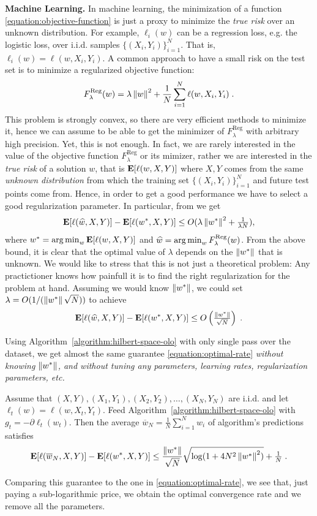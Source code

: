 \textbf{Machine Learning.} In machine learning, the minimization of a function
\eqref{equation:objective-function} is just a proxy to minimize the \emph{true
risk} over an unknown distribution. For example, $\ell_i(w)$ can be a
regression loss, e.g. the logistic loss, over i.i.d. samples $\{(X_i,
Y_i)\}_{i=1}^N$. That is, $\ell_i(w)=\ell(w,X_i,Y_i)$. A common approach to
have a small risk on the test set is to minimize a regularized objective
function:
%
\begin{equation}
\label{eq:reg_logloss}
F_\lambda^{\text{Reg}}(w) = \lambda \left\|{w}\right\|^2 + \frac{1}{N} \sum_{i=1}^N \ell(w, X_i, Y_i) \; .
\end{equation}
%
This problem is strongly convex, so there are very efficient methods to
minimize it, hence we can assume to be able to get the minimizer of
$F_\lambda^{\text{Reg}}$ with arbitrary high precision. Yet, this is not
enough. In fact, we are rarely interested in the value of the objective
function $F_\lambda^{\text{Reg}}$ or its mimizer, rather we are interested in
the \emph{true risk} of a solution $w$, that is $\operatorname*{\mathbf{E}}[\ell(w,X,Y)]$ where $X,Y$
comes from the same \emph{unknown distribution} from which the training set
$\{(X_i,Y_i)\}_{i=1}^N$ and future test points come from. Hence, in order to
get a good performance we have to select a good regularization parameter. In
particular, from \cite{Sridharan-Shalev-Shwartz-Srebro-2009} we get
\[
\operatorname*{\mathbf{E}}[\ell(\widehat{w},X,Y)] - \operatorname*{\mathbf{E}}[\ell(w^*,X,Y)] \le O(\lambda \left\|{w^*}\right\|^2 + \tfrac{1}{\lambda N}),
\]
where $w^*=\operatorname*{arg\,min}_w \operatorname*{\mathbf{E}}[\ell(w,X,Y)]$ and $\widehat{w} = \operatorname*{arg\,min}_w
F_\lambda^{\text{Reg}}(w)$.  From the above bound, it is clear that the optimal value
of $\lambda$ depends on the $\left\|{w^*}\right\|$ that is unknown. We would like to
stress that this is not just a theoretical problem: Any practictioner knows how
painfull it is to find the right regularization for the problem at hand.
Assuming we would know $\left\|{w^*}\right\|$, we could set $\lambda = O(1/(\left\|{w^*}\right\|
\sqrt{N}))$ to achieve
%
\begin{equation}
\label{equation:optimal-rate}
\operatorname*{\mathbf{E}}[\ell(\widehat{w},X,Y)] - \operatorname*{\mathbf{E}}[\ell(w^*,X,Y)] \le O\left(\tfrac{\left\|{w^*}\right\|}{\sqrt{N}}\right) \; .
\end{equation}

Using Algorithm~\ref{algorithm:hilbert-space-olo} with only single pass over
the dataset, we get almost the same guarantee \eqref{equation:optimal-rate}
\emph{without knowing $\left\|{w^*}\right\|$, and without tuning any parameters, learning
rates, regularization parameters, etc.}
%
\begin{theorem}
Assume that $(X, Y), (X_1, Y_1), (X_2, Y_2), \dots, (X_N,Y_N)$ are i.i.d.  and
let $\ell_t(w) = \ell(w,X_t,Y_t)$. Feed
Algorithm~\ref{algorithm:hilbert-space-olo} with $g_t = - \partial
\ell_t(w_t)$. Then the average $\overline{w}_N = \frac{1}{N} \sum_{i=1}^N w_i$
of algorithm's predictions satisfies
$$
\operatorname*{\mathbf{E}}[\ell(\overline{w}_N,X,Y)] - \operatorname*{\mathbf{E}}[\ell(w^*,X,Y)] \le \frac{\left\|{w^*}\right\|}{\sqrt{N}} \sqrt{\log(1+4 N^2 \left\|{w^*}\right\|^2)} + \tfrac{1}{N} \; .
$$
\end{theorem}
%
Comparing this guarantee to the one in \eqref{equation:optimal-rate}, we see
that, just paying a sub-logarithmic price, we obtain the optimal convergence
rate and we remove all the parameters.
